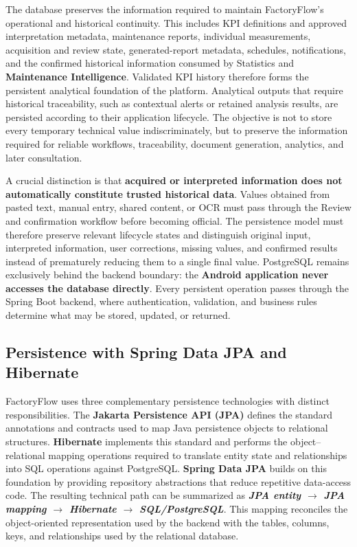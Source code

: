 The database preserves the information required to maintain FactoryFlow's operational and historical continuity. This includes KPI definitions and approved interpretation metadata, maintenance reports, individual measurements, acquisition and review state, generated-report metadata, schedules, notifications, and the confirmed historical information consumed by Statistics and \textbf{Maintenance Intelligence}. Validated KPI history therefore forms the persistent analytical foundation of the platform. Analytical outputs that require historical traceability, such as contextual alerts or retained analysis results, are persisted according to their application lifecycle. The objective is not to store every temporary technical value indiscriminately, but to preserve the information required for reliable workflows, traceability, document generation, analytics, and later consultation.

A crucial distinction is that \textbf{acquired or interpreted information does not automatically constitute trusted historical data}. Values obtained from pasted text, manual entry, shared content, or OCR must pass through the Review and confirmation workflow before becoming official. The persistence model must therefore preserve relevant lifecycle states and distinguish original input, interpreted information, user corrections, missing values, and confirmed results instead of prematurely reducing them to a single final value. PostgreSQL remains exclusively behind the backend boundary: the \textbf{Android application never accesses the database directly}. Every persistent operation passes through the Spring Boot backend, where authentication, validation, and business rules determine what may be stored, updated, or returned.
\subsection{Persistence with Spring Data JPA and Hibernate}
\label{subsec:backend-jpa-hibernate}

FactoryFlow uses three complementary persistence technologies with distinct responsibilities. The \textbf{Jakarta Persistence API (JPA)} defines the standard annotations and contracts used to map Java persistence objects to relational structures. \textbf{Hibernate} implements this standard and performs the object--relational mapping operations required to translate entity state and relationships into SQL operations against PostgreSQL. \textbf{Spring Data JPA} builds on this foundation by providing repository abstractions that reduce repetitive data-access code. The resulting technical path can be summarized as \textbf{\textit{JPA entity $\rightarrow$ JPA mapping $\rightarrow$ Hibernate $\rightarrow$ SQL/PostgreSQL}}. This mapping reconciles the object-oriented representation used by the backend with the tables, columns, keys, and relationships used by the relational database.

